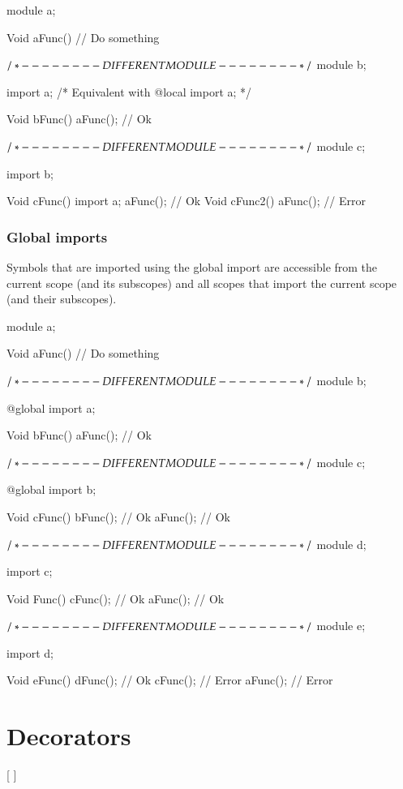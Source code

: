 \begin{code}
module a;

Void aFunc() {
	// Do something
}

$/* - - - - - - - - DIFFERENT MODULE - - - - - - - - */$
module b;

import a; /* Equivalent with @local import a; */

Void bFunc() {
	aFunc(); // Ok
}

$/* - - - - - - - - DIFFERENT MODULE - - - - - - - - */$
module c;

import b;

Void cFunc() {
	import a;
	aFunc(); // Ok
}
Void cFunc2() {
	aFunc(); // Error	
}
\end{code}

\subsection{Global imports} \label{decorator:global}
Symbols that are imported using the global import are accessible from the current scope (and its subscopes) and all scopes that import the current scope (and their subscopes).

\begin{code}
module a;

Void aFunc() {
	// Do something
}

$/* - - - - - - - - DIFFERENT MODULE - - - - - - - - */$
module b;

@global import a;

Void bFunc() {
	aFunc(); // Ok
}

$/* - - - - - - - - DIFFERENT MODULE - - - - - - - - */$
module c;

@global import b;

Void cFunc() {
	bFunc(); // Ok
	aFunc(); // Ok	
}

$/* - - - - - - - - DIFFERENT MODULE - - - - - - - - */$
module d;

import c;

Void Func() {
	cFunc(); // Ok
	aFunc(); // Ok
}

$/* - - - - - - - - DIFFERENT MODULE - - - - - - - - */$
module e;

import d;

Void eFunc() {
	dFunc(); // Ok
	cFunc(); // Error
	aFunc(); // Error	
}
\end{code}

\chapter{Decorators}
\begin{grammar}
	   [  ]
\end{grammar}

